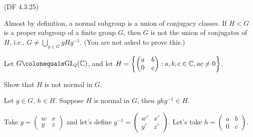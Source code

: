 \begin{problem}{(\textsf{DF 4.3.25})}

  \noindent
  Almost by definition, a normal subgroup is a union of conjugacy classes.
  If $H < G$ is a proper subgroup of a finite group $G$,
  then $G$ is not the union of conjugates of $H$, i.e.,
  $G \neq \bigcup_{g \in G} gHg^{-1}$.
  (You are not asked to prove this.)

  \noindent
  Let $G \colonequals \GL_2(\C)$, and let $\displaystyle{H=\left\{\begin{pmatrix} a &
  b \\ 0 & c \end{pmatrix} :a,b,c \in \mathbb{C}, ac \neq 0\right\}}$.  
  \begin{enumalph}
    \item Show that $H$ is not normal in $G$.
    \begin{Answer}
      Let $g \in G$, $h \in H$.
      Suppose $H$ is normal in $G$, then $ghg^{-1} \in H$.

      \noindent
      Take $g = \begin{pmatrix} w & x \\ y & z \end{pmatrix}$ and
      let's define $g^{-1} = \begin{pmatrix} w' & x' \\ y' & z' \end{pmatrix}$.
      Let's take $h = \begin{pmatrix} a & b \\ 0 & c \end{pmatrix}$.


\end{Answer}
\end{enumalph}
\end{problem}
